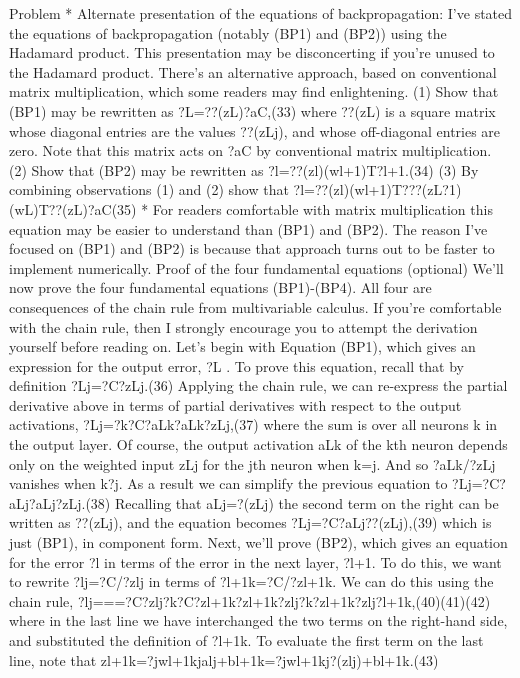 Problem
* Alternate presentation of the equations of backpropagation: I've stated the equations of backpropagation (notably (BP1) and (BP2)) using the Hadamard product. This presentation may be disconcerting if you're unused to the Hadamard product. There's an alternative approach, based on conventional matrix multiplication, which some readers may find enlightening. (1) Show that (BP1) may be rewritten as 
?L=??(zL)?aC,(33)
where ??(zL) is a square matrix whose diagonal entries are the values ??(zLj), and whose off-diagonal entries are zero. Note that this matrix acts on ?aC by conventional matrix multiplication. (2) Show that (BP2) may be rewritten as 
?l=??(zl)(wl+1)T?l+1.(34)
(3) By combining observations (1) and (2) show that 
?l=??(zl)(wl+1)T???(zL?1)(wL)T??(zL)?aC(35)
* For readers comfortable with matrix multiplication this equation may be easier to understand than (BP1) and (BP2). The reason I've focused on (BP1) and (BP2) is because that approach turns out to be faster to implement numerically. 
Proof of the four fundamental equations (optional)
We'll now prove the four fundamental equations (BP1)-(BP4). All four are consequences of the chain rule from multivariable calculus. If you're comfortable with the chain rule, then I strongly encourage you to attempt the derivation yourself before reading on.
Let's begin with Equation (BP1), which gives an expression for the output error, ?L
. To prove this equation, recall that by definition 
?Lj=?C?zLj.(36)
Applying the chain rule, we can re-express the partial derivative above in terms of partial derivatives with respect to the output activations, 
?Lj=?k?C?aLk?aLk?zLj,(37)
where the sum is over all neurons k in the output layer. Of course, the output activation aLk of the kth neuron depends only on the weighted input zLj for the jth neuron when k=j. And so ?aLk/?zLj vanishes when k?j. As a result we can simplify the previous equation to 
?Lj=?C?aLj?aLj?zLj.(38)
Recalling that aLj=?(zLj) the second term on the right can be written as ??(zLj), and the equation becomes 
?Lj=?C?aLj??(zLj),(39)
which is just (BP1), in component form.
Next, we'll prove (BP2), which gives an equation for the error ?l
in terms of the error in the next layer, ?l+1. To do this, we want to rewrite ?lj=?C/?zlj in terms of ?l+1k=?C/?zl+1k. We can do this using the chain rule, 
?lj===?C?zlj?k?C?zl+1k?zl+1k?zlj?k?zl+1k?zlj?l+1k,(40)(41)(42)
where in the last line we have interchanged the two terms on the right-hand side, and substituted the definition of ?l+1k. To evaluate the first term on the last line, note that 
zl+1k=?jwl+1kjalj+bl+1k=?jwl+1kj?(zlj)+bl+1k.(43)
